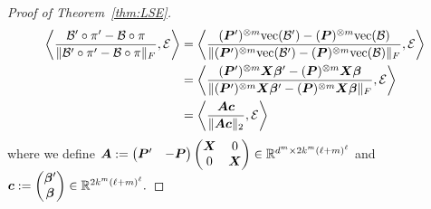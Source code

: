 \documentclass[12pt]{article}
\theoremstyle{definition}
\begin{document}
\begin{proof}[Proof of Theorem~\ref{thm:LSE}]
\begin{align}\label{eq:inner}
   \left\langle {\mathcal{B}'\circ \pi'-\mathcal{B}\circ \pi \over \lVert\mathcal{B}'\circ \pi'-\mathcal{B}\circ \pi\rVert_F}, \mathcal{E} \right \rangle &=  \left\langle {(\bm{P}')^{\otimes m}\text{vec}(\mathcal{B}')-(\bm{P})^{\otimes m}\text{vec}(\mathcal{B}) \over \lVert(\bm{P}')^{\otimes m}\text{vec}(\mathcal{B}')-(\bm{P})^{\otimes m}\text{vec}(\mathcal{B})\rVert_F}, \mathcal{E} \right \rangle\notag \\
    &=\left\langle {(\bm{P}')^{\otimes m}\bm X\boldsymbol{\beta}'-(\bm{P})^{\otimes m}\bm X\boldsymbol{\beta}\over \lVert(\bm{P}')^{\otimes m}\bm X\boldsymbol{\beta}'-(\bm{P})^{\otimes m}\bm X\boldsymbol{\beta}\rVert_F}, \mathcal{E} \right \rangle\notag
    \\&=
     \left\langle {\bm A\bm{c}\over \lVert\bm A\bm{c}\rVert_2}, \mathcal{E} \right \rangle
\end{align}
where we define $\bm A := \begin{pmatrix}\bm{P}' &-\bm{P}\end{pmatrix}\begin{pmatrix}\bm X & 0\\ 0&\bm X\end{pmatrix}\in\mathbb{R}^{d^m\times 2k^m(\ell+m)^\ell}$ and $\bm{c}:=\begin{pmatrix} \boldsymbol{\beta}'\\\boldsymbol{\beta}\end{pmatrix}\in\mathbb{R}^{2k^m(\ell+m)^\ell}.$


\end{proof}
\end{document}
